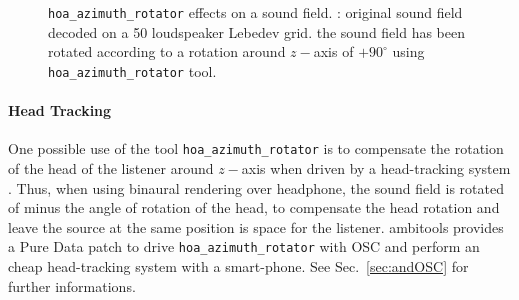 \documentclass[10pt,a4paper]{article}
\begin{document}
\begin{figure}[!ht]
\centering
{}
\caption{\lstinline'hoa_azimuth_rotator' effects on a sound field. : original sound field decoded on a 50 loudspeaker Lebedev grid.  the sound field has been rotated according to a rotation around $z-$axis of $+90^\circ$ using \lstinline'hoa_azimuth_rotator' tool.}
\label{fig:hoa_azimuth_rotator_2}
\end{figure}
\paragraph{Head Tracking}
One possible use of the tool \lstinline'hoa_azimuth_rotator' is to compensate the rotation of the head of the listener around $z-$axis when driven by a head-tracking system \cite{noisternig20033d}. Thus, when using binaural rendering over headphone, the sound field is rotated of minus the angle of rotation of the head, to compensate the head rotation and leave the source at the same position is space for the listener. ambitools provides a Pure Data patch to drive \lstinline'hoa_azimuth_rotator' with OSC and perform an cheap head-tracking system with a smart-phone. See Sec.~\ref{sec:andOSC} for further informations.

\pagebreak
\end{document}
